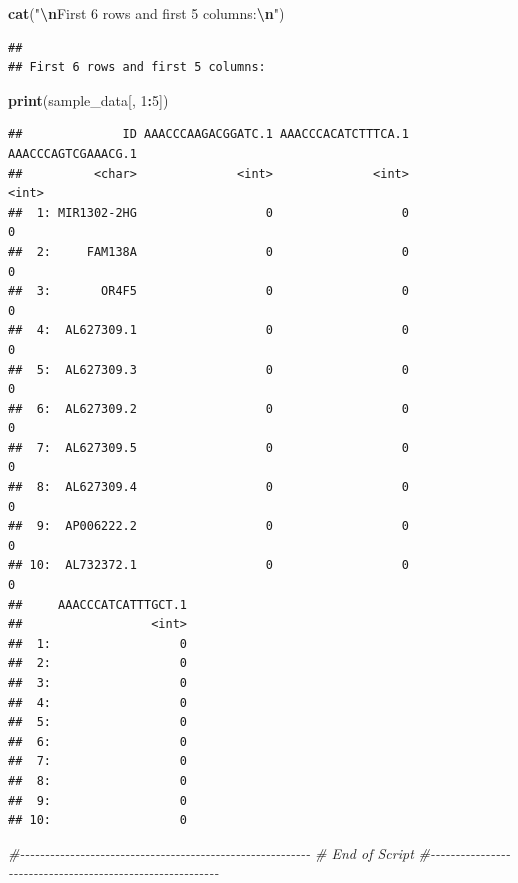 \documentclass[
]{article}
\newenvironment{Shaded}{\begin{snugshade}}{\end{snugshade}}
\newcommand{\CommentTok}[1]{\textcolor[rgb]{0.56,0.35,0.01}{\textit{#1}}}
\newcommand{\DecValTok}[1]{\textcolor[rgb]{0.00,0.00,0.81}{#1}}
\newcommand{\FunctionTok}[1]{\textcolor[rgb]{0.13,0.29,0.53}{\textbf{#1}}}
\newcommand{\NormalTok}[1]{#1}
\newcommand{\SpecialCharTok}[1]{\textcolor[rgb]{0.81,0.36,0.00}{\textbf{#1}}}
\newcommand{\StringTok}[1]{\textcolor[rgb]{0.31,0.60,0.02}{#1}}
\begin{document}
\begin{Shaded}
\begin{Highlighting}[]
\FunctionTok{cat}\NormalTok{(}\StringTok{"}\SpecialCharTok{\textbackslash{}n}\StringTok{First 6 rows and first 5 columns:}\SpecialCharTok{\textbackslash{}n}\StringTok{"}\NormalTok{)}
\end{Highlighting}
\end{Shaded}

\begin{verbatim}
## 
## First 6 rows and first 5 columns:
\end{verbatim}

\begin{Shaded}
\begin{Highlighting}[]
\FunctionTok{print}\NormalTok{(sample\_data[, }\DecValTok{1}\SpecialCharTok{:}\DecValTok{5}\NormalTok{])}
\end{Highlighting}
\end{Shaded}

\begin{verbatim}
##              ID AAACCCAAGACGGATC.1 AAACCCACATCTTTCA.1 AAACCCAGTCGAAACG.1
##          <char>              <int>              <int>              <int>
##  1: MIR1302-2HG                  0                  0                  0
##  2:     FAM138A                  0                  0                  0
##  3:       OR4F5                  0                  0                  0
##  4:  AL627309.1                  0                  0                  0
##  5:  AL627309.3                  0                  0                  0
##  6:  AL627309.2                  0                  0                  0
##  7:  AL627309.5                  0                  0                  0
##  8:  AL627309.4                  0                  0                  0
##  9:  AP006222.2                  0                  0                  0
## 10:  AL732372.1                  0                  0                  0
##     AAACCCATCATTTGCT.1
##                  <int>
##  1:                  0
##  2:                  0
##  3:                  0
##  4:                  0
##  5:                  0
##  6:                  0
##  7:                  0
##  8:                  0
##  9:                  0
## 10:                  0
\end{verbatim}

\begin{Shaded}
\begin{Highlighting}[]
\CommentTok{\#{-}{-}{-}{-}{-}{-}{-}{-}{-}{-}{-}{-}{-}{-}{-}{-}{-}{-}{-}{-}{-}{-}{-}{-}{-}{-}{-}{-}{-}{-}{-}{-}{-}{-}{-}{-}{-}{-}{-}{-}{-}{-}{-}{-}{-}{-}{-}{-}{-}{-}{-}{-}{-}{-}{-}{-}{-}{-}}
\CommentTok{\# End of Script}
\CommentTok{\#{-}{-}{-}{-}{-}{-}{-}{-}{-}{-}{-}{-}{-}{-}{-}{-}{-}{-}{-}{-}{-}{-}{-}{-}{-}{-}{-}{-}{-}{-}{-}{-}{-}{-}{-}{-}{-}{-}{-}{-}{-}{-}{-}{-}{-}{-}{-}{-}{-}{-}{-}{-}{-}{-}{-}{-}{-}{-}}
\end{Highlighting}
\end{Shaded}
\end{document}
